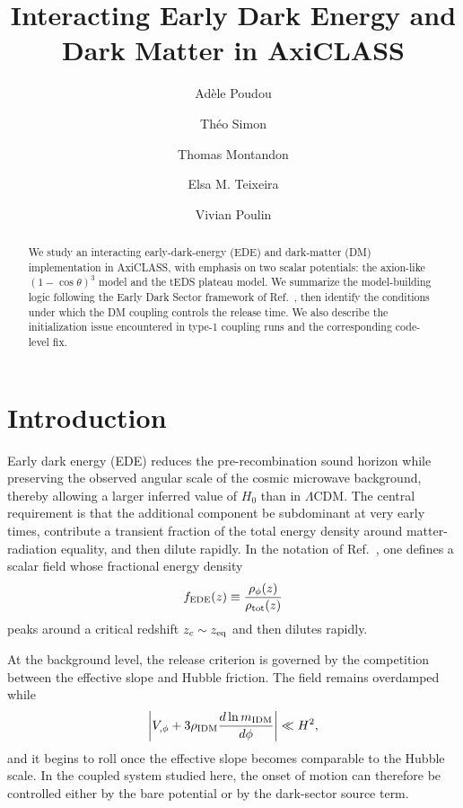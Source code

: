 \documentclass[aps,onecolumn,prd,nofootinbib,superscriptaddress,10pt,longbibliography,floatfix]{revtex4-2}
\newcommand{\fe}{f_{\rm EDE}}
\begin{document}
\title{Interacting Early Dark Energy and Dark Matter in AxiCLASS}
\author{Ad\`ele Poudou}
\author{Th\'eo Simon}
\author{Thomas Montandon}
\author{Elsa M. Teixeira}
\author{Vivian Poulin}

\begin{abstract}
We study an interacting early-dark-energy (EDE) and dark-matter (DM) implementation in AxiCLASS, with emphasis on two scalar potentials: the axion-like $(1-\cos\theta)^3$ model and the tEDS plateau model. We summarize the model-building logic following the Early Dark Sector framework of Ref.~\cite{McDonough:2021}, then identify the conditions under which the DM coupling controls the release time. We also describe the initialization issue encountered in type-1 coupling runs and the corresponding code-level fix.
\end{abstract}

\maketitle

\section{Introduction}
Early dark energy (EDE) reduces the pre-recombination sound horizon while preserving the observed angular scale of the cosmic microwave background, thereby allowing a larger inferred value of $H_0$ than in $\Lambda$CDM. The central requirement is that the additional component be subdominant at very early times, contribute a transient fraction of the total energy density around matter-radiation equality, and then dilute rapidly. In the notation of Ref.~\cite{McDonough:2021}, one defines a scalar field whose fractional energy density
\begin{equation}
\fe(z) \equiv \frac{\rho_\phi(z)}{\rho_{\rm tot}(z)}
\end{equation}
peaks around a critical redshift $z_c \sim z_{\rm eq}$ and then dilutes rapidly.

At the background level, the release criterion is governed by the competition between the effective slope and Hubble friction. The field remains overdamped while
\begin{equation}
\left|V_{,\phi} + 3\rho_{\rm IDM}\frac{d\ln m_{\rm IDM}}{d\phi}\right| \ll H^2,
\end{equation}
and it begins to roll once the effective slope becomes comparable to the Hubble scale. In the coupled system studied here, the onset of motion can therefore be controlled either by the bare potential or by the dark-sector source term.
\end{document}
